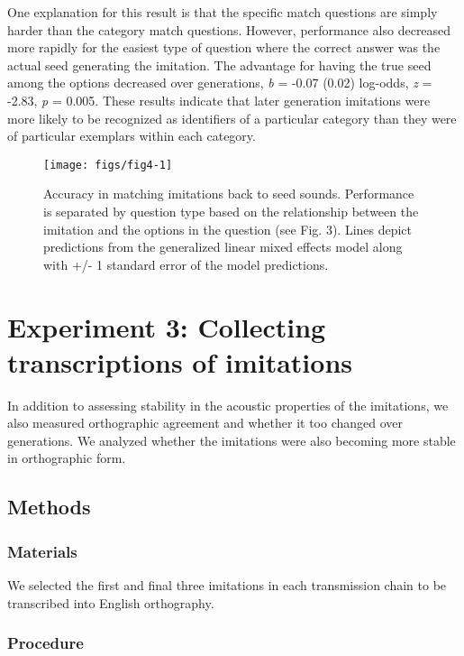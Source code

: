 \documentclass[10pt,letterpaper]{article}
\begin{document}
One explanation for this result is that the specific match questions are
simply harder than the category match questions. However, performance
also decreased more rapidly for the easiest type of question where the
correct answer was the actual seed generating the imitation. The
advantage for having the true seed among the options decreased over
generations, \emph{b} = -0.07 (0.02) log-odds, \emph{z} = -2.83,
\emph{p} = 0.005. These results indicate that later generation
imitations were more likely to be recognized as identifiers of a
particular category than they were of particular exemplars within each
category.

\begin{figure}
\texttt{[image: figs/fig4-1]} \caption{Accuracy in matching imitations back to seed sounds. Performance is separated by question type based on the relationship between the imitation and the options in the question (see Fig. 3). Lines depict predictions from the generalized linear mixed effects model along with +/- 1 standard error of the model predictions.}\label{fig:fig4}
\end{figure}

\section{Experiment 3: Collecting transcriptions of
imitations}\label{experiment-3-collecting-transcriptions-of-imitations}

In addition to assessing stability in the acoustic properties of the
imitations, we also measured orthographic agreement and whether it too
changed over generations. We analyzed whether the imitations were also
becoming more stable in orthographic form.

\subsection{Methods}\label{methods-2}

\subsubsection{Materials}\label{materials-2}

We selected the first and final three imitations in each transmission
chain to be transcribed into English orthography.

\subsubsection{Procedure}\label{procedure-2}
\end{document}
